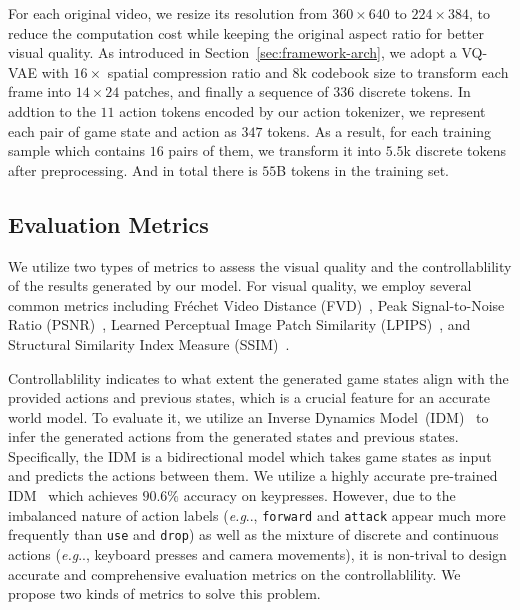 \documentclass{article} %
\makeatletter
\DeclareRobustCommand\onedot{\futurelet\@let@token\@onedot}
\def\@onedot{\ifx\@let@token.\else.\null\fi\xspace}
\def\eg{\emph{e.g}\onedot} \def\Eg{\emph{E.g}\onedot}
\makeatother
\begin{document}
For each original video, we resize its resolution from $360\times 640$ to $224\times 384$, to reduce the computation cost while keeping the original aspect ratio for better visual quality. As introduced in Section~\ref{sec:framework-arch}, we adopt a VQ-VAE with $16\times$ spatial compression ratio and $8$k codebook size to transform each frame into $14\times 24$ patches, and finally a sequence of $336$ discrete tokens. In addtion to the $11$ action tokens encoded by our action tokenizer, we represent each pair of game state and action as $347$ tokens. As a result, for each training sample which contains $16$ pairs of them, we transform it into $5.5$k discrete tokens after preprocessing. And in total there is $55$B tokens in the training set.

\subsection{Evaluation Metrics}
\label{sec:eval-metric}

We utilize two types of metrics to assess the visual quality and the controllablility of the results generated by our model. For visual quality, we employ several common metrics including Fréchet Video Distance (FVD)~\citep{unterthiner2018towards}, Peak Signal-to-Noise Ratio (PSNR)~\citep{hore2010image}, Learned Perceptual Image Patch Similarity (LPIPS)~\citep{zhang2018unreasonable}, and Structural Similarity Index Measure (SSIM)~\citep{wang2004image}. 

Controllablility indicates to what extent the generated game states align with the provided actions and previous states, which is a crucial feature for an accurate world model. To evaluate it, we utilize an Inverse Dynamics Model~(IDM)~\citep{baker2022video} to infer the generated actions from the generated states and previous states. Specifically, the IDM is a bidirectional model which takes game states as input and predicts the actions between them. We utilize a highly accurate pre-trained IDM~\citep{baker2022video} which achieves $90.6 \%$ accuracy on keypresses.
However, due to the imbalanced nature of action labels (\eg, \texttt{forward} and \texttt{attack} appear much more frequently than \texttt{use} and \texttt{drop}) as well as the mixture of discrete and continuous actions (\eg, keyboard presses and camera movements), it is non-trival to design accurate and comprehensive evaluation metrics on the controllablility.
We propose two kinds of metrics to solve this problem.
\end{document}
